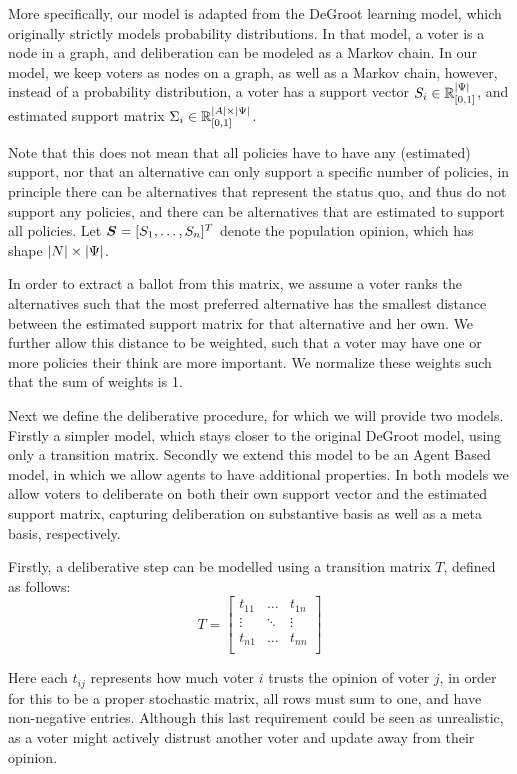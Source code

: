 More specifically, our model is adapted from the DeGroot learning model, which
originally strictly models probability distributions. In that model, a voter is
a node in a graph, and deliberation can be modeled as a Markov chain. In our
model, we keep voters as nodes on a graph, as well as a Markov chain, however,
instead of a probability distribution, a voter has a support vector $S_i \in
\mathbb{R}^{|\Psi|}_{[0,1]}$, and estimated support matrix $\Sigma_i\in
\mathbb{R}^{|A| \times |\Psi|}_{[0,1]}$.

Note that this does not mean that all policies have to have any (estimated)
support, nor that an alternative can only support a specific number of
policies, in principle there can be alternatives that represent the status quo,
and thus do not support any policies, and there can be alternatives that are
estimated to support all policies.  Let $\boldsymbol{S}= [S_1, \dots,
S_{n}]^{T}$ denote the population opinion, which has shape \(|N|
\times |\Psi|\).

In order to extract a ballot from this matrix, we assume a voter ranks the
alternatives such that the most preferred alternative has the smallest distance
between the estimated support matrix for that alternative and her own. We
further allow this distance to be weighted, such that a voter may have one or
more policies their think are more important. We normalize these weights such
that the sum of weights is 1.

Next we define the deliberative procedure, for which we will provide two
models. Firstly a simpler model, which stays closer to the original DeGroot
model, using only a transition matrix. Secondly we extend this model to be an
Agent Based model, in which we allow agents to have additional properties. In
both models we allow voters to deliberate on both their own support vector and
the estimated support matrix, capturing deliberation on substantive basis as
well as a meta basis, respectively.

Firstly, a deliberative step can be modelled using a transition matrix $T$,
defined as follows: \[ T=\begin{bmatrix} t_{11} & \dots  & t_{1n} \\ \vdots &
\ddots & \vdots \\ t_{n1} & \dots  & t_{nn} \\ \end{bmatrix} \]

Here each $t_{ij}$ represents how much voter $i$ trusts the opinion of voter
$j$, in order for this to be a proper stochastic matrix, all rows must sum to
one, and have non-negative entries. Although this last requirement could be
seen as unrealistic, as a voter might actively distrust another voter and
update away from their opinion.

